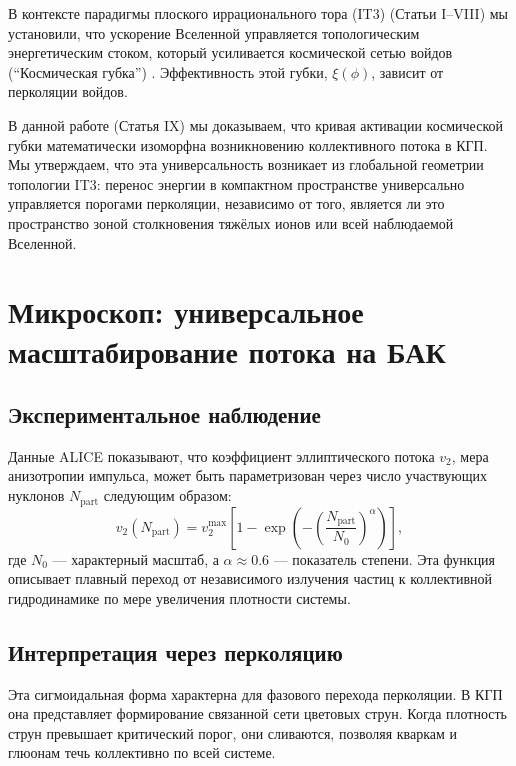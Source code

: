 \documentclass[12pt,a4paper]{article}
\begin{document}
В контексте парадигмы плоского иррационального тора (IT3) (Статьи I--VIII) мы установили, что ускорение Вселенной управляется топологическим энергетическим стоком, который усиливается космической сетью войдов (``Космическая губка'') \citep{Logvinovich2026c, Logvinovich2026d}. Эффективность этой губки, $\xi(\phi)$, зависит от перколяции войдов.

В данной работе (Статья IX) мы доказываем, что кривая активации космической губки математически изоморфна возникновению коллективного потока в КГП. Мы утверждаем, что эта универсальность возникает из глобальной геометрии топологии IT3: перенос энергии в компактном пространстве универсально управляется порогами перколяции, независимо от того, является ли это пространство зоной столкновения тяжёлых ионов или всей наблюдаемой Вселенной.

\section{Микроскоп: универсальное масштабирование потока на БАК}

\subsection{Экспериментальное наблюдение}

Данные ALICE показывают, что коэффициент эллиптического потока $v_2$, мера анизотропии импульса, может быть параметризован через число участвующих нуклонов $N_{\mathrm{part}}$ следующим образом:
\begin{equation}
v_2(N_{\mathrm{part}}) = v_2^{\max} \left[ 1 - \exp\left( -\left(\frac{N_{\mathrm{part}}}{N_0}\right)^\alpha \right) \right],
\label{eq:alice_scaling}
\end{equation}
где $N_0$ — характерный масштаб, а $\alpha \approx 0.6$ — показатель степени. Эта функция описывает плавный переход от независимого излучения частиц к коллективной гидродинамике по мере увеличения плотности системы.

\subsection{Интерпретация через перколяцию}

Эта сигмоидальная форма характерна для фазового перехода перколяции. В КГП она представляет формирование связанной сети цветовых струн. Когда плотность струн превышает критический порог, они сливаются, позволяя кваркам и глюонам течь коллективно по всей системе.
\end{document}
